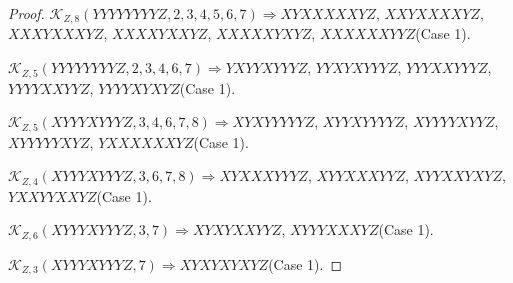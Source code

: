 \documentclass[12pt]{article}
\theoremstyle{plain}
\theoremstyle{definition}
\theoremstyle{remark}
\newcommand{\fancy}[1]{\mathcal{#1}}
\def\K{\fancy{K}}
\begin{document}
\begin{proof}
	
	$\K_{Z,8}(YYYYYYYYZ,2, 3, 4, 5, 6, 7)\Rightarrow $$XYXXXXXYZ$, $XXYXXXXYZ$, $XXXYXXXYZ$, $XXXXYXXYZ$, $XXXXXYXYZ$, $XXXXXXYYZ$(Case 1).
	
	$\K_{Z,5}(YYYYYYYYZ,2, 3, 4, 6, 7)\Rightarrow $$YXYYXYYYZ$, $YYXYXYYYZ$, $YYYXXYYYZ$, $YYYYXXYYZ$, $YYYYXYXYZ$(Case 1).
	
	$\K_{Z,5}(XYYYXYYYZ,3, 4, 6, 7, 8)\Rightarrow $$XYXYYYYYZ$, $XYYXYYYYZ$, $XYYYYXYYZ$, $XYYYYYXYZ$, $YXXXXXXYZ$(Case 1).
	
	$\K_{Z,4}(XYYYXYYYZ,3, 6, 7, 8)\Rightarrow $$XYXXXYYYZ$, $XYYXXXYYZ$, $XYYXXYXYZ$, $YXXYYXXYZ$(Case 1).
	
	$\K_{Z,6}(XYYYXYYYZ,3, 7)\Rightarrow $$XYXYXXYYZ$, $XYYYXXXYZ$(Case 1).
	
	$\K_{Z,3}(XYYYXYYYZ,7)\Rightarrow $$XYXYXYXYZ$(Case 1).
	
	
	

\end{proof}
\end{document}
